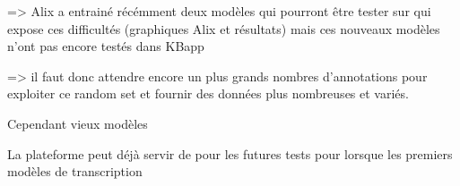 => Alix a entrainé récémment deux modèles qui pourront être tester sur qui expose ces difficultés (graphiques Alix et résultats) mais ces nouveaux modèles n'ont pas encore testés dans KBapp

=> il faut donc attendre encore un plus grands nombres d'annotations pour exploiter ce random set et fournir des données plus nombreuses et variés. 

Cependant vieux modèles


La plateforme peut déjà servir de pour les futures tests pour lorsque les premiers modèles de transcription